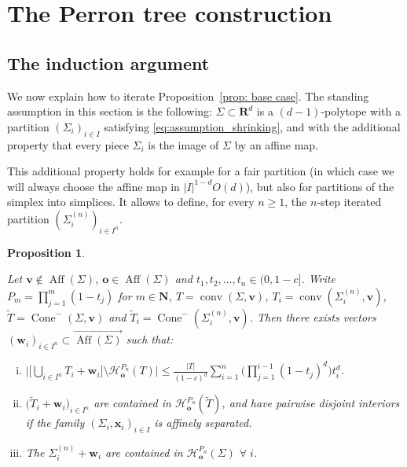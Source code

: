 \documentclass[10pt]{amsart}
\newcommand{\R}{\mathbf{R}}
\newcommand{\N}{\mathbf{N}}
\newcommand{\ocone}[2]{\operatorname{Cone}^-(#1,#2)}
\newtheorem{proposition}[theorem]{Proposition}
\begin{document}
\section{The Perron tree construction}\label{sec: perron iterative}
\subsection{The induction argument}
We now explain how to iterate Proposition~\ref{prop: base case}. The standing assumption in this section is the following: $\Sigma \subset \R^d$ is a $(d-1)$-polytope  with a partition $(\Sigma_i)_{i \in I}$ satisfying \eqref{eq:assumption_shrinking}, and with the additional property that every piece $\Sigma_i$ is the image of $\Sigma$ by an affine map. 

This additional property holds for example for a fair partition (in which case we will always choose the affine map in $|I|^{1-d} O(d)$), but also for partitions of the simplex into simplices. It allows to define, for every $n \geq 1$, the $n$-step iterated partition $(\Sigma_i^{(n)})_{i \in I^n}$.
\begin{proposition}\label{prop: perron tree}

Let $\mathbf{v}\notin \operatorname{Aff}(\Sigma)$, $\mathbf{o}\in \operatorname{Aff}(\Sigma)$ and $t_1, t_2,\dots,t_n\in (0,1-c]$. Write  $P_m=\prod_{j=1}^{m}(1-t_j)$ for $m\in \N$, $T=\operatorname{conv}(\Sigma, \mathbf{v})$, $T_i=\operatorname{conv}(\Sigma_i^{(n)}, \mathbf{v})$, $\widetilde{T}=\ocone{\Sigma}{\mathbf{v}}$ and $\widetilde{T}_i=\ocone{\Sigma_i^{(n)}}{\mathbf{v}}$. Then there exists vectors $(\mathbf{w}_i)_{i\in I^n}\subset \overrightarrow{\operatorname{Aff}(\Sigma)}$ such that:
\begin{enumerate}[(i)]
    \item $\displaystyle \bigg|\bigg[\bigcup_{i\in I^n} T_i+\mathbf{w}_i\bigg]\setminus\mathcal{H}_\mathbf{o}^{P_n}(T)\bigg|\leq \frac{|T|}{(1-c)^d}\sum_{i=1}^n\bigg(\prod_{j=1}^{i-1}(1-t_j)^d\bigg)t_{i}^d$.
    \item $\displaystyle \big(\widetilde{T}_i+\mathbf{w}_i\big)_{i\in I^n}$ are contained in $\mathcal{H}_\mathbf{o}^{P_n}(\widetilde{T})$, and have pairwise disjoint interiors if the family $(\Sigma_i,\mathbf{x}_i)_{i \in I}$ is affinely separated.
\item The $\Sigma_i^{(n)}+
    \mathbf{w}_i$ are contained in $\mathcal{H}_\mathbf{o}^{P_n}(\Sigma)$ $\forall\;i$.
\end{enumerate}
\end{proposition}
\end{document}
